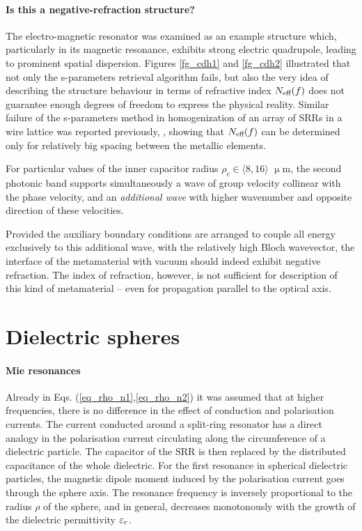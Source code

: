 \paragraph{Is this a negative-refraction structure?}%
The electro-magnetic resonator was examined as an example structure which, particularly in its magnetic resonance, exhibits strong electric quadrupole, leading to prominent spatial dispersion. Figures \ref{fg_cdh1} and \ref{fg_cdh2} illustrated that not only the s-parameters retrieval algorithm fails, but also the very idea of describing the structure behaviour in terms of refractive index $N_{\text{eff} }(f)$ does not guarantee enough degrees of freedom to express the physical reality.
Similar failure of the s-parameters method in homogenization of an array of SRRs in a wire lattice was reported previously, \cite{rockstuhl2008transition}, showing that $N_{\text{eff} }(f)$ can be determined only for relatively big spacing between the metallic  elements.

For particular values of the inner capacitor radius $\rho_c \in \langle8,16\rangle$ $\upmu$m, the second photonic band supports simultaneously a wave of group velocity collinear with the phase velocity, and an \textit{additional wave} with higher wavenumber and opposite direction of these velocities. 

Provided the auxiliary boundary conditions are arranged to couple all energy exclusively to this additional wave, with the relatively high Bloch wavevector, the interface of the metamaterial with vacuum should indeed exhibit negative refraction. The index of refraction, however, is not sufficient for description of this kind of metamaterial -- even for propagation parallel to the optical axis.



\FloatBarrier %
\section{Dielectric spheres} %
\paragraph{Mie resonances}%
Already in Eqs. (\ref{eq_rho_n1},\ref{eq_rho_n2}) it was assumed that at higher frequencies, there is no difference in the effect of conduction and polarisation currents. The current conducted around a split-ring resonator has a direct analogy in the polarisation current circulating along the circumference of a dielectric particle. The capacitor of the SRR is then replaced by the distributed capacitance of the whole dielectric. For the first resonance in spherical dielectric particles, the magnetic dipole moment induced by the polarisation current goes through the sphere axis. The resonance frequency is inversely proportional to the radius $\rho$ of the sphere, and in general, decreases monotonously with the growth of the dielectric permittivity $\varepsilon_r$.

